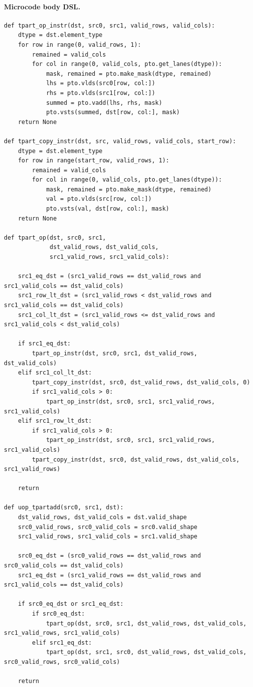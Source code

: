 \paragraph{Microcode body DSL.}
\begin{lstlisting}[style=ptocode]
def tpart_op_instr(dst, src0, src1, valid_rows, valid_cols):
    dtype = dst.element_type
    for row in range(0, valid_rows, 1):
        remained = valid_cols
        for col in range(0, valid_cols, pto.get_lanes(dtype)):
            mask, remained = pto.make_mask(dtype, remained)
            lhs = pto.vlds(src0[row, col:])
            rhs = pto.vlds(src1[row, col:])
            summed = pto.vadd(lhs, rhs, mask)
            pto.vsts(summed, dst[row, col:], mask)
    return None

def tpart_copy_instr(dst, src, valid_rows, valid_cols, start_row):
    dtype = dst.element_type
    for row in range(start_row, valid_rows, 1):
        remained = valid_cols
        for col in range(0, valid_cols, pto.get_lanes(dtype)):
            mask, remained = pto.make_mask(dtype, remained)
            val = pto.vlds(src[row, col:])
            pto.vsts(val, dst[row, col:], mask)
    return None

def tpart_op(dst, src0, src1,
             dst_valid_rows, dst_valid_cols,
             src1_valid_rows, src1_valid_cols):

    src1_eq_dst = (src1_valid_rows == dst_valid_rows and src1_valid_cols == dst_valid_cols)
    src1_row_lt_dst = (src1_valid_rows < dst_valid_rows and src1_valid_cols == dst_valid_cols)
    src1_col_lt_dst = (src1_valid_rows <= dst_valid_rows and src1_valid_cols < dst_valid_cols)

    if src1_eq_dst:
        tpart_op_instr(dst, src0, src1, dst_valid_rows, dst_valid_cols)
    elif src1_col_lt_dst:
        tpart_copy_instr(dst, src0, dst_valid_rows, dst_valid_cols, 0)
        if src1_valid_cols > 0:
            tpart_op_instr(dst, src0, src1, src1_valid_rows, src1_valid_cols)
    elif src1_row_lt_dst:
        if src1_valid_cols > 0:
            tpart_op_instr(dst, src0, src1, src1_valid_rows, src1_valid_cols)
        tpart_copy_instr(dst, src0, dst_valid_rows, dst_valid_cols, src1_valid_rows)

    return

def uop_tpartadd(src0, src1, dst):
    dst_valid_rows, dst_valid_cols = dst.valid_shape
    src0_valid_rows, src0_valid_cols = src0.valid_shape
    src1_valid_rows, src1_valid_cols = src1.valid_shape

    src0_eq_dst = (src0_valid_rows == dst_valid_rows and src0_valid_cols == dst_valid_cols)
    src1_eq_dst = (src1_valid_rows == dst_valid_rows and src1_valid_cols == dst_valid_cols)

    if src0_eq_dst or src1_eq_dst:
        if src0_eq_dst:
            tpart_op(dst, src0, src1, dst_valid_rows, dst_valid_cols, src1_valid_rows, src1_valid_cols)
        elif src1_eq_dst:
            tpart_op(dst, src1, src0, dst_valid_rows, dst_valid_cols, src0_valid_rows, src0_valid_cols)

    return
\end{lstlisting}
\Needspace{0.34\textheight}

